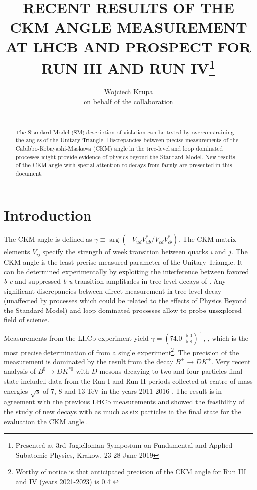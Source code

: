 \documentclass{appolb}
\begin{document}
\title{RECENT RESULTS OF THE CKM ANGLE \g MEASUREMENT AT LHCB AND PROSPECT FOR RUN III AND RUN IV\footnote{Presented at 3rd Jagiellonian Symposium on Fundamental and Applied Subatomic Physics, Krakow, 23-28 June 2019} }
\author{Wojciech Krupa \\ on behalf of the \lhcb collaboration 
\address{AGH University of Science and Technology \\Faculty of Physics and Applied Computer Science \\ al. Mickiewicza 30, 30-059 Krakow, Poland}
\\
}
\maketitle
\begin{abstract}
The Standard Model (SM) description of \CP violation can be tested by overconstraining the angles of the Unitary Triangle. Discrepancies between precise measurements of the Cabibbo-Kobayashi-Maskawa (CKM) angle \g in the tree-level and loop dominated processes might provide evidence of physics beyond the Standard Model. New results of the CKM angle \g with special attention to decays from  family are presented in this document.

\end{abstract}

\section{Introduction}
The CKM angle \g is defined as $\gamma \equiv \arg(-V_{ud}V_{ub}^{*}/V_{cd}V_{cb}^{*})$.  The CKM matrix elements $V_{ij}$ specify the strength of week transition between quarks $i$ and $j$. The CKM angle \g is the least precise measured parameter of the Unitary Triangle. It can be determined experimentally by exploiting the interference between favored \textit{b} \to \textit{c} and suppressed \textit{b} \to \textit{u} transition amplitudes in tree-level decays of .
 Any significant discrepancies between direct measurement in tree-level decay (unaffected by processes which could be related to the effects of Physics Beyond the Standard Model) and loop dominated processes allow to probe unexplored field of science.  

Measurements from the LHCb experiment yield $\gamma=(74.0^{+5.0}_{-5.8})^\circ$ \cite{gamma_B2DK}, \cite{gamma_comb}, which is the most precise determination of \g from a single experiment\footnote{Worthy of notice is that anticipated precision of the CKM angle \g for Run III and IV (years 2021-2023) is 0.4$^\circ$\cite{lhcb_phys_case}}. The precision of the measurement is dominated by the result from the decay $B^+\rightarrow D K^+$. Very recent analysis of $B^0\rightarrow D K^{*0}$ with $D$ mesons decaying to two and four particles final state included data from the Run I and Run II periods collected at centre-of-mass energies $\sqrt s$ of 7, 8 and 13 TeV in the years 2011-2016 \cite{B2Dkstar0}. The result is in agreement with the previous LHCb measurements and showed the feasibility of the study of new decays with as much as six particles in the final state for the evaluation the CKM angle \g.  
\end{document}
